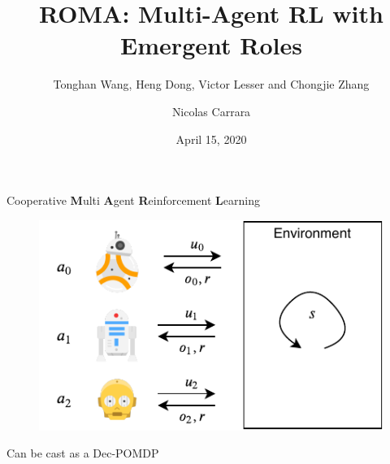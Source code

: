 \documentclass{beamer}
\author[shortname]{Nicolas Carrara}
\institute[shortinst]{University of Toronto}
\title[ROMA]{ROMA: Multi-Agent RL with Emergent Roles}
\subtitle{Tonghan Wang, Heng Dong, Victor Lesser and Chongjie Zhang}
\date{April 15, 2020}
\begin{document}
    \begin{frame}
        \maketitle
        \centering
    \end{frame}

    \begin{frame}{Cooperative \textbf{M}ulti \textbf{A}gent \textbf{R}einforcement \textbf{L}earning}

        \begin{figure}
            \includegraphics[width=0.75\linewidth]{img/marl.pdf}
        \end{figure}
        \pause
        \begin{exampleblock}{}
            Can be cast as a Dec-POMDP
        \end{exampleblock}

    \end{frame}
\end{document}
